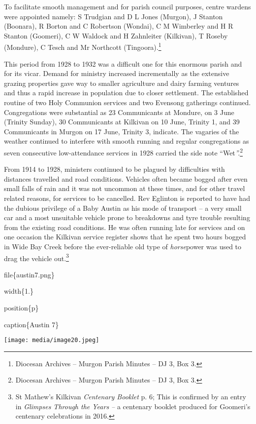 To facilitate smooth management and for parish council purposes, centre wardens were appointed namely: S Trudgian and D L Jones (Murgon), J Stanton (Boonara), R Borton and C Robertson (Wondai), C M Wimberley and H R Stanton (Goomeri), C W Waldock and H Zahnleiter (Kilkivan), T Roseby (Mondure), C Tesch and Mr Northcott (Tingoora).\footnote{Diocesan Archives -- Murgon Parish Minutes -- DJ 3, Box 3.}

This period from 1928 to 1932 was a difficult one for this enormous parish and for its vicar. Demand for ministry increased incrementally as the extensive grazing properties gave way to smaller agriculture and dairy farming ventures and thus a rapid increase in population due to closer settlement. The established routine of two Holy Communion services and two Evensong gatherings continued. Congregations were substantial as 23 Communicants at Mondure, on 3 June (Trinity Sunday), 30 Communicants at Kilkivan on 10 June, Trinity 1, and 39 Communicants in Murgon on 17 June, Trinity 3, indicate. The vagaries of the weather continued to interfere with smooth running and regular congregations as seven consecutive low-attendance services in 1928 carried the side note ``Wet\emph{''.}\footnote{Diocesan Archives -- Murgon Parish Minutes -- DJ 3, Box 3.}

From 1914 to 1928, ministers continued to be plagued by difficulties with distances travelled and road conditions. Vehicles often became bogged after even small falls of rain and it was not uncommon at these times, and for other travel related reasons, for services to be cancelled. Rev Eglinton is reported to have had the dubious privilege of a Baby Austin as his mode of transport -- a very small car and a most unsuitable vehicle prone to breakdowns and tyre trouble resulting from the existing road conditions. He was often running late for services and on one occasion the Kilkivan service register shows that he spent two hours bogged in Wide Bay Creek before the ever-reliable old type of \emph{horse}power was used to drag the vehicle out.\footnote{St Mathew's Kilkivan \emph{Centenary Booklet} p. 6; This is confirmed by an entry in \emph{Glimpses Through the Years --} a centenary booklet produced for Goomeri's centenary celebrations in 2016.}

file\{austin7.png\}

width\{1.\}

position\{p\}

caption\{Austin 7\}

\texttt{[image: media/image20.jpeg]}

